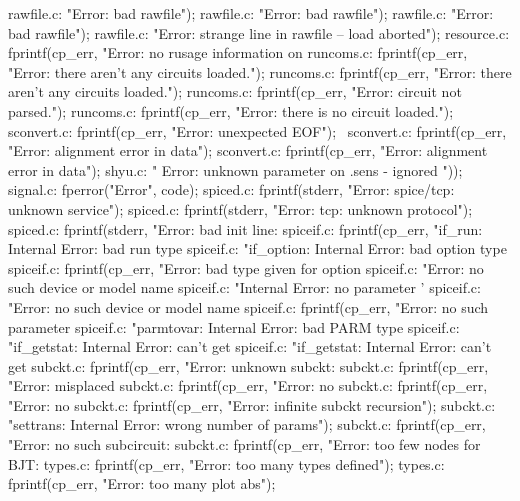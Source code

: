 {{{{{{rawfile.c:                        "Error: bad rawfile\n");
rawfile.c:                        "Error: bad rawfile\n");
rawfile.c:                        "Error: bad rawfile\n");
rawfile.c:            "Error: strange line in rawfile -- load aborted\n");
resource.c:        fprintf(cp_err, "Error: no rusage information on %
runcoms.c:        fprintf(cp_err, "Error: there aren't any circuits loaded.\n");
runcoms.c:        fprintf(cp_err, "Error: there aren't any circuits loaded.\n");
runcoms.c:        fprintf(cp_err, "Error: circuit not parsed.\n");
runcoms.c:        fprintf(cp_err, "Error: there is no circuit loaded.\n");
sconvert.c:                fprintf(cp_err, "Error: unexpected EOF\n"); \
sconvert.c:        fprintf(cp_err, "Error: alignment error in data\n");
sconvert.c:        fprintf(cp_err, "Error: alignment error in data\n");
shyu.c:            " Error: unknown parameter on .sens - ignored \n"));
signal.c:    fperror("Error", code);
spiced.c:            fprintf(stderr, "Error: spice/tcp: unknown service\n");
spiced.c:            fprintf(stderr, "Error: tcp: unknown protocol\n");
spiced.c:        fprintf(stderr, "Error: bad init line: %
spiceif.c:        fprintf(cp_err, "if_run: Internal Error: bad run type %
spiceif.c:            "if_option: Internal Error: bad option type %
spiceif.c:    fprintf(cp_err, "Error: bad type given for option %
spiceif.c:                "Error: no such device or model name %
spiceif.c:            "Internal Error: no parameter '%
spiceif.c:                "Error: no such device or model name %
spiceif.c:            fprintf(cp_err, "Error: no such parameter %
spiceif.c:            "parmtovar: Internal Error: bad PARM type %
spiceif.c:                "if_getstat: Internal Error: can't get %
spiceif.c:                "if_getstat: Internal Error: can't get %
subckt.c:                fprintf(cp_err, "Error: unknown subckt: %
subckt.c:            fprintf(cp_err, "Error: misplaced %
subckt.c:                fprintf(cp_err, "Error: no %
subckt.c:                fprintf(cp_err, "Error: no %
subckt.c:        fprintf(cp_err, "Error: infinite subckt recursion\n");
subckt.c:            "settrans: Internal Error: wrong number of params\n");
subckt.c:            fprintf(cp_err, "Error: no such subcircuit: %
subckt.c:        fprintf(cp_err, "Error: too few nodes for BJT: %
types.c:            fprintf(cp_err, "Error: too many types defined\n");
types.c:                fprintf(cp_err, "Error: too many plot abs\n");
}}}}}}
